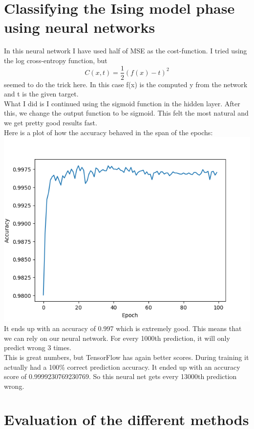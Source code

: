 \documentclass[a4paper,norsk]{article}
\begin{document}
\section{Classifying the Ising model phase using neural networks}
In this neural network I have used half of MSE as the cost-function. I tried using the log cross-entropy function, but
$$ C(x, t) = \frac{1}{2} (f(x) - t)^2$$
seemed to do the trick here. In this case f(x) is the computed y from the network and t is the given target.\\
What I did is I continued using the sigmoid function in the hidden layer. After this, we change the output function to be sigmoid. This felt the most natural and we get pretty good results fast.\\
Here is a plot of how the accuracy behaved in the span of the epochs:\\
\includegraphics[scale=.7]{images/classNN100epoch}\\
It ends up with an accuracy of 0.997 which is extremely good. This means that we can rely on our neural network. For every 1000th prediction, it will only predict wrong 3 times.\\
This is great numbers, but TensorFlow has again better scores. During training it actually had a 100\% correct prediction accuracy. It ended up with an accuracy score of 0.9999230769230769. So this neural net gets every 13000th prediction wrong. 



\clearpage
\section{Evaluation of the different methods}
\end{document}
